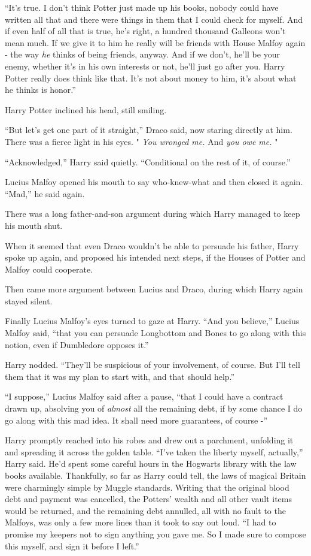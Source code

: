 ``It's true. I don't think Potter just made up his books, nobody could
have written all that and there were things in them that I could check
for myself. And if even half of all that is true, he's right, a hundred
thousand Galleons won't mean much. If we give it to him he really will
be friends with House Malfoy again - the way \emph{he} thinks of being
friends, anyway. And if we don't, he'll be your enemy, whether it's in
his own interests or not, he'll just go after you. Harry Potter really
does think like that. It's not about money to him, it's about what he
thinks is honor.''

Harry Potter inclined his head, still smiling.

``But let's get one part of it straight,'' Draco said, now staring
directly at him. There was a fierce light in his eyes. " \emph{You
wronged me.} And \emph{you owe me.} "

``Acknowledged,'' Harry said quietly. ``Conditional on the rest of it,
of course.''

Lucius Malfoy opened his mouth to say who-knew-what and then closed it
again. ``Mad,'' he said again.

There was a long father-and-son argument during which Harry managed to
keep his mouth shut.

When it seemed that even Draco wouldn't be able to persuade his father,
Harry spoke up again, and proposed his intended next steps, if the
Houses of Potter and Malfoy could cooperate.

Then came more argument between Lucius and Draco, during which Harry
again stayed silent.

Finally Lucius Malfoy's eyes turned to gaze at Harry. ``And you
believe,'' Lucius Malfoy said, ``that you can persuade Longbottom and
Bones to go along with this notion, even if Dumbledore opposes it.''

Harry nodded. ``They'll be suspicious of your involvement, of course.
But I'll tell them that it was my plan to start with, and that should
help.''

``I suppose,'' Lucius Malfoy said after a pause, ``that I could have a
contract drawn up, absolving you of \emph{almost} all the remaining
debt, if by some chance I do go along with this mad idea. It shall need
more guarantees, of course -''

Harry promptly reached into his robes and drew out a parchment,
unfolding it and spreading it across the golden table. ``I've taken the
liberty myself, actually,'' Harry said. He'd spent some careful hours in
the Hogwarts library with the law books available. Thankfully, so far as
Harry could tell, the laws of magical Britain were charmingly simple by
Muggle standards. Writing that the original blood debt and payment was
cancelled, the Potters' wealth and all other vault items would be
returned, and the remaining debt annulled, all with no fault to the
Malfoys, was only a few more lines than it took to say out loud. ``I had
to promise my keepers not to sign anything you gave me. So I made sure
to compose this myself, and sign it before I left.''

